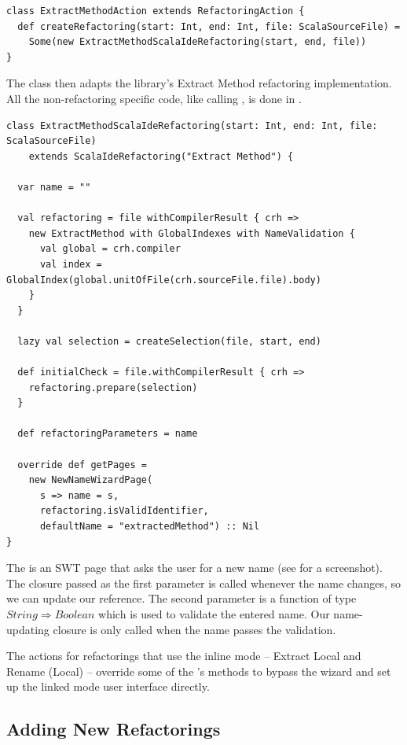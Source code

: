 \documentclass[10pt,a4paper,oneside]{scrreprt}
\begin{document}
\begin{lstlisting}
class ExtractMethodAction extends RefactoringAction {
  def createRefactoring(start: Int, end: Int, file: ScalaSourceFile) = 
    Some(new ExtractMethodScalaIdeRefactoring(start, end, file))
}
\end{lstlisting}

The  class then adapts the library's Extract Method refactoring implementation. All the non-refactoring specific code, like calling , is done in .

\newpage
\begin{lstlisting}
class ExtractMethodScalaIdeRefactoring(start: Int, end: Int, file: ScalaSourceFile) 
    extends ScalaIdeRefactoring("Extract Method") {
  
  var name = ""
  
  val refactoring = file withCompilerResult { crh => 
    new ExtractMethod with GlobalIndexes with NameValidation {
      val global = crh.compiler
      val index = GlobalIndex(global.unitOfFile(crh.sourceFile.file).body)
    }
  }

  lazy val selection = createSelection(file, start, end)

  def initialCheck = file.withCompilerResult { crh =>
    refactoring.prepare(selection)
  }
  
  def refactoringParameters = name
  
  override def getPages = 
    new NewNameWizardPage(
      s => name = s, 
      refactoring.isValidIdentifier, 
      defaultName = "extractedMethod") :: Nil 
}
\end{lstlisting}

The  is an SWT page that asks the user for a new name (see  for a screenshot). The closure passed as the first parameter is called whenever the name changes, so we can update our reference. The second parameter is a function of type $String \Rightarrow Boolean$ which is used to validate the entered name. Our name-updating closure is only called when the name passes the validation.

The actions for refactorings that use the inline mode -- Extract Local and Rename (Local) -- override some of the 's methods to bypass the wizard and set up the linked mode user interface directly.

\subsection{Adding New Refactorings}
\end{document}
